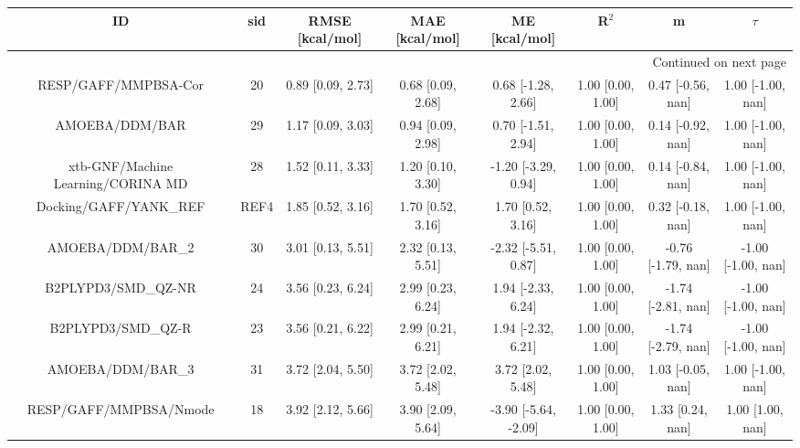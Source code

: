\documentclass[8pt]{article}
\begin{document}
\begin{center}
\begin{footnotesize}
\begin{longtable}{|cccccccc|}
\toprule
                                 ID &   sid &       RMSE [kcal/mol] &        MAE [kcal/mol] &         ME [kcal/mol] &              R$^2$ &                   m &              $\tau$ \\
\midrule
\endhead
\midrule
\multicolumn{8}{r}{{Continued on next page}} \\
\midrule
\endfoot

\bottomrule
\endlastfoot
               RESP/GAFF/MMPBSA-Cor &    20 &     0.89 [0.09, 2.73] &     0.68 [0.09, 2.68] &    0.68 [-1.28, 2.66] &  1.00 [0.00, 1.00] &   0.47 [-0.56, nan] &   1.00 [-1.00, nan] \\
                     AMOEBA/DDM/BAR &    29 &     1.17 [0.09, 3.03] &     0.94 [0.09, 2.98] &    0.70 [-1.51, 2.94] &  1.00 [0.00, 1.00] &   0.14 [-0.92, nan] &   1.00 [-1.00, nan] \\
 xtb-GNF/Machine Learning/CORINA MD &    28 &     1.52 [0.11, 3.33] &     1.20 [0.10, 3.30] &   -1.20 [-3.29, 0.94] &  1.00 [0.00, 1.00] &   0.14 [-0.84, nan] &   1.00 [-1.00, nan] \\
             Docking/GAFF/YANK\_REF &  REF4 &     1.85 [0.52, 3.16] &     1.70 [0.52, 3.16] &     1.70 [0.52, 3.16] &  1.00 [0.00, 1.00] &   0.32 [-0.18, nan] &   1.00 [-1.00, nan] \\
                  AMOEBA/DDM/BAR\_2 &    30 &     3.01 [0.13, 5.51] &     2.32 [0.13, 5.51] &   -2.32 [-5.51, 0.87] &  1.00 [0.00, 1.00] &  -0.76 [-1.79, nan] &  -1.00 [-1.00, nan] \\
                B2PLYPD3/SMD\_QZ-NR &    24 &     3.56 [0.23, 6.24] &     2.99 [0.23, 6.24] &    1.94 [-2.33, 6.24] &  1.00 [0.00, 1.00] &  -1.74 [-2.81, nan] &  -1.00 [-1.00, nan] \\
                 B2PLYPD3/SMD\_QZ-R &    23 &     3.56 [0.21, 6.22] &     2.99 [0.21, 6.21] &    1.94 [-2.32, 6.21] &  1.00 [0.00, 1.00] &  -1.74 [-2.79, nan] &  -1.00 [-1.00, nan] \\
                  AMOEBA/DDM/BAR\_3 &    31 &     3.72 [2.04, 5.50] &     3.72 [2.02, 5.48] &     3.72 [2.02, 5.48] &  1.00 [0.00, 1.00] &   1.03 [-0.05, nan] &   1.00 [-1.00, nan] \\
             RESP/GAFF/MMPBSA/Nmode &    18 &     3.92 [2.12, 5.66] &     3.90 [2.09, 5.64] &  -3.90 [-5.64, -2.09] &  1.00 [0.00, 1.00] &    1.33 [0.24, nan] &    1.00 [1.00, nan] \\

\end{longtable}
\end{footnotesize}
\end{center}
\end{document}
